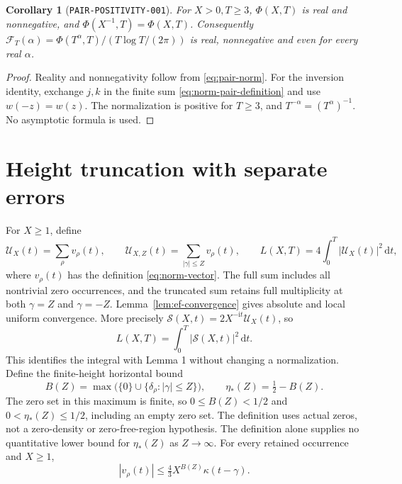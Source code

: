 \documentclass[11pt]{article}
\newtheorem{corollary}[lemma]{Corollary}
\newcommand{\dd}{\,\mathrm d}
\newcommand{\ii}{\mathrm i}
\newcommand{\ZS}{\mathcal S}
\newcommand{\US}{\mathcal U}
\begin{document}
\begin{corollary}[\texttt{PAIR-POSITIVITY-001}]\label{cor:pair-positivity}
For \(X>0,T\geq3\), \(\Phi(X,T)\) is real and nonnegative, and
\(\Phi(X^{-1},T)=\Phi(X,T)\). Consequently
\(\mathcal F_T(\alpha)=\Phi(T^\alpha,T)/(T\log T/(2\pi))\)
is real, nonnegative and even for every real \(\alpha\).
\end{corollary}
\begin{proof}
Reality and nonnegativity follow from \eqref{eq:pair-norm}.
For the inversion identity, exchange \(j,k\) in the finite sum
\eqref{eq:norm-pair-definition} and use \(w(-z)=w(z)\).
The normalization is positive for \(T\geq3\), and
\(T^{-\alpha}=(T^\alpha)^{-1}\). No asymptotic formula is used.
\end{proof}

\section{Height truncation with separate errors}

For \(X\geq1\), define
\begin{equation}\label{eq:trunc-definitions}
 \US_X(t)=\sum_\rho v_\rho(t),\qquad
 \US_{X,Z}(t)=\sum_{|\gamma|\leq Z}v_\rho(t),\qquad
 L(X,T)=4\int_0^T|\US_X(t)|^2\dd t,
\end{equation}
where \(v_\rho(t)\) has the definition \eqref{eq:norm-vector}.
The full sum includes all nontrivial zero occurrences, and the truncated
sum retains full multiplicity at both \(\gamma=Z\) and \(\gamma=-Z\).
Lemma~\ref{lem:ef-convergence} gives absolute and local uniform
convergence. More precisely
\(\ZS(X,t)=2X^{-\ii t}\US_X(t)\), so
\begin{equation}\label{eq:trunc-phase}
 L(X,T)=\int_0^T|\ZS(X,t)|^2\dd t.
\end{equation}
This identifies the integral with Lemma 1 without changing a normalization.
Define the finite-height horizontal bound
\begin{equation}\label{eq:horizontal-envelope}
 B(Z)=\max\bigl(\{0\}\cup\{\delta_\rho:|\gamma|\leq Z\}\bigr),
 \qquad \eta_*(Z)=\tfrac12-B(Z).
\end{equation}
The zero set in this maximum is finite, so
\(0\leq B(Z)<1/2\) and \(0<\eta_*(Z)\leq1/2\), including an empty
zero set. The definition uses actual zeros, not a zero-density or
zero-free-region hypothesis. The definition alone supplies no quantitative lower bound
for \(\eta_*(Z)\) as \(Z\to\infty\).
For every retained occurrence and \(X\geq1\),
\begin{equation}\label{eq:horizontal-majorant}
 |v_\rho(t)|\leq\tfrac43X^{B(Z)}\kappa(t-\gamma).
\end{equation}
\end{document}
